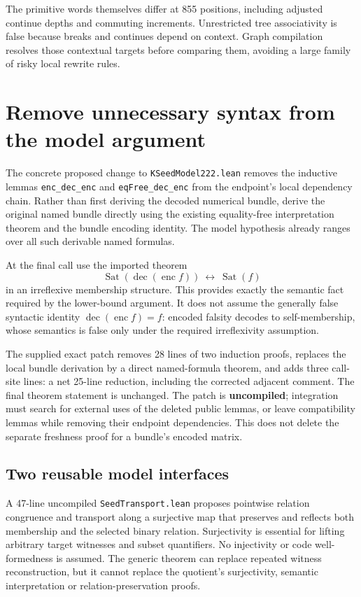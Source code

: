 \documentclass[11pt]{article}
\begin{document}
The primitive words themselves differ at 855 positions, including adjusted continue depths and commuting increments. Unrestricted tree associativity is false because breaks and continues depend on context. Graph compilation resolves those contextual targets before comparing them, avoiding a large family of risky local rewrite rules.

\section{Remove unnecessary syntax from the model argument}
The concrete proposed change to \texttt{KSeedModel222.lean} removes the inductive lemmas \texttt{enc\_dec\_enc} and \texttt{eqFree\_dec\_enc} from the endpoint's local dependency chain. Rather than first deriving the decoded numerical bundle, derive the original named bundle directly using the existing equality-free interpretation theorem and the bundle encoding identity. The model hypothesis already ranges over all such derivable named formulas.

At the final call use the imported theorem
\[
 \operatorname{Sat}(\operatorname{dec}(\operatorname{enc} f))
 \ \longleftrightarrow\ \operatorname{Sat}(f)
\]
in an irreflexive membership structure. This provides exactly the semantic fact required by the lower-bound argument. It does not assume the generally false syntactic identity $\operatorname{dec}(\operatorname{enc} f)=f$: encoded falsity decodes to self-membership, whose semantics is false only under the required irreflexivity assumption.

The supplied exact patch removes 28 lines of two induction proofs, replaces the local bundle derivation by a direct named-formula theorem, and adds three call-site lines: a net 25-line reduction, including the corrected adjacent comment. The final theorem statement is unchanged. The patch is \textbf{uncompiled}; integration must search for external uses of the deleted public lemmas, or leave compatibility lemmas while removing their endpoint dependencies. This does not delete the separate freshness proof for a bundle's encoded matrix.

\subsection{Two reusable model interfaces}
A 47-line uncompiled \texttt{SeedTransport.lean} proposes pointwise relation congruence and transport along a surjective map that preserves and reflects both membership and the selected binary relation. Surjectivity is essential for lifting arbitrary target witnesses and subset quantifiers. No injectivity or code well-formedness is assumed. The generic theorem can replace repeated witness reconstruction, but it cannot replace the quotient's surjectivity, semantic interpretation or relation-preservation proofs.
\end{document}
